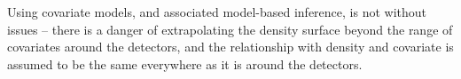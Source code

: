 \documentclass[useAMS,usenatbib,referee]{biom}
\begin{document}
Using covariate models, and associated model-based inference, is not without issues -- there is a danger of extrapolating the density surface beyond the range of covariates around the detectors, and the relationship with density and covariate is assumed to be the same everywhere as it is around the detectors. %

\end{document}
